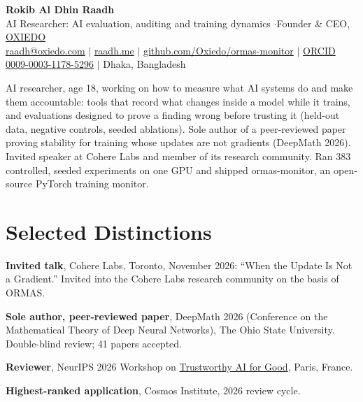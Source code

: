\documentclass[10pt,a4paper]{article}
\begin{document}
\RaggedRight
\color{body}

\begin{center}
  {\LARGE\bfseries\color{heading} Rokib Al Dhin Raadh}\\[3pt]
  {\small AI Researcher: AI evaluation, auditing and training dynamics \enspace$\cdot$\enspace Founder \& CEO, \href{https://oxiedo.com}{OXIEDO}}\\[3pt]
  {\footnotesize
    \href{mailto:raadh@oxiedo.com}{raadh@oxiedo.com}
    \enspace$|$\enspace
    \href{https://www.raadh.me}{raadh.me}
    \enspace$|$\enspace
    \href{https://github.com/Oxiedo/ormas-monitor}{github.com/Oxiedo/ormas-monitor}
    \enspace$|$\enspace
    \href{https://orcid.org/0009-0003-1178-5296}{ORCID 0009-0003-1178-5296}
    \enspace$|$\enspace
    {\color{muted}Dhaka, Bangladesh}
  }
\end{center}
\vspace{1pt}

{\small\noindent AI researcher, age 18, working on how to measure what AI systems do and make them accountable: tools that record what changes inside a model while it trains, and evaluations designed to prove a finding wrong before trusting it (held-out data, negative controls, seeded ablations). Sole author of a peer-reviewed paper proving stability for training whose updates are not gradients (DeepMath 2026). Invited speaker at Cohere Labs and member of its research community. Ran 383 controlled, seeded experiments on one GPU and shipped ormas-monitor, an open-source PyTorch training monitor.\par}

\section*{Selected Distinctions}
\begin{bullets}
  \item \textbf{Invited talk}, Cohere Labs, Toronto, November 2026: ``When the Update Is Not a Gradient.'' Invited into the Cohere Labs research community on the basis of ORMAS.
  \item \textbf{Sole author, peer-reviewed paper}, DeepMath 2026 (Conference on the Mathematical Theory of Deep Neural Networks), The Ohio State University. Double-blind review; 41 papers accepted.
  \item \textbf{Reviewer}, NeurIPS 2026 Workshop on \href{https://trustworthy-ai-for-good.github.io/}{Trustworthy AI for Good}, Paris, France.
  \item \textbf{Highest-ranked application}, Cosmos Institute, 2026 review cycle.
\end{bullets}
\end{document}
